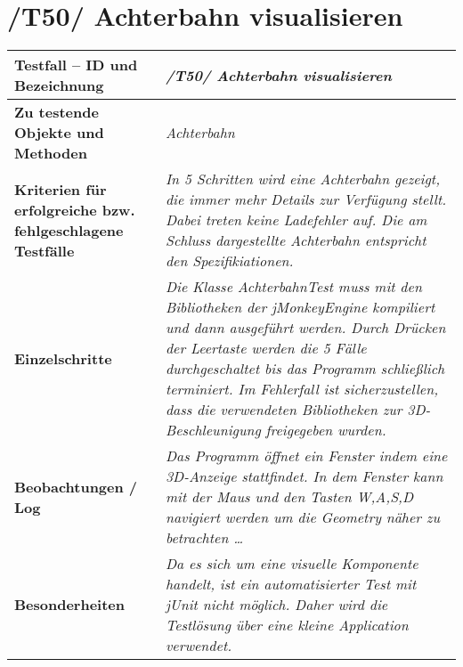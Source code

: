 \section{/T50/ Achterbahn visualisieren}


\begin{longtable}{|p{7cm}|p{10cm}|}
\hline
\textbf{Testfall -- ID und Bezeichnung} &  \textit{/T50/ Achterbahn visualisieren} \\
\hline
\textbf{Zu testende Objekte und Methoden} &  \textit{Achterbahn}
\\
\hline
\textbf{Kriterien für erfolgreiche bzw. fehlgeschlagene Testfälle} &
\textit{In 5 Schritten wird eine Achterbahn gezeigt, die immer mehr Details zur Verfügung stellt. Dabei treten keine Ladefehler auf. Die am Schluss dargestellte Achterbahn entspricht den Spezifikiationen. } \\
\hline
\textbf{Einzelschritte} &  \textit{ Die Klasse AchterbahnTest muss mit den Bibliotheken der jMonkeyEngine kompiliert und dann ausgeführt werden. Durch Drücken der Leertaste werden die 5 Fälle durchgeschaltet bis das 
Programm schließlich terminiert. Im Fehlerfall ist sicherzustellen, dass die verwendeten Bibliotheken zur 3D-Beschleunigung freigegeben wurden.
} \\
\hline
\textbf{Beobachtungen / Log} &  \textit{Das Programm öffnet ein Fenster indem eine 3D-Anzeige stattfindet. In dem Fenster kann mit der Maus und den Tasten W,A,S,D navigiert werden um die Geometry näher zu betrachten \ldots} \\
\hline
\textbf{Besonderheiten } &  \textit{Da es sich um eine visuelle Komponente handelt, ist ein automatisierter Test mit jUnit nicht möglich. Daher wird die Testlösung über eine kleine Application verwendet.} \\
\hline

 \end{longtable}





